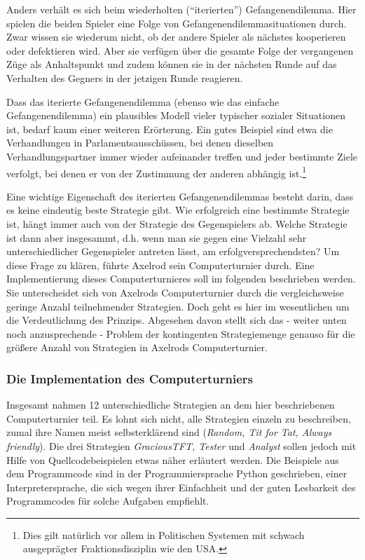 \documentclass[12pt,a4paper,ngerman]{article}
\begin{document}
Anders verhält es sich beim wiederholten ("`iterierten"')
Gefangenendilemma. Hier spielen die beiden Spieler eine Folge von
Gefangenendilemmasituationen durch. Zwar wissen sie wiederum nicht, ob
der andere Spieler als nächstes kooperieren oder defektieren
wird. Aber sie verfügen über die gesamte Folge der vergangenen Züge
als Anhaltspunkt und zudem können sie in der nächsten Runde auf das
Verhalten des Gegners in der jetzigen Runde reagieren.

Dass das iterierte Gefangenendilemma (ebenso wie das einfache
Gefangenendilemma) ein plausibles Modell vieler typischer sozialer
Situationen ist, bedarf kaum einer weiteren Erörterung. Ein gutes
Beispiel sind etwa die Verhandlungen in Parlamentsausschüssen, bei
denen dieselben Verhandlungspartner immer wieder aufeinander treffen
und jeder bestimmte Ziele verfolgt, bei denen er von der Zustimmung
der anderen abhängig ist.\footnote{Dies gilt natürlich vor allem in
Politischen Systemen mit schwach ausgeprägter Fraktionsdisziplin wie
den USA.}

Eine wichtige Eigenschaft des iterierten Gefangenendilemmas besteht
darin, dass es keine eindeutig beste Strategie gibt.  Wie erfolgreich
eine bestimmte Strategie ist, hängt immer auch von der Strategie des
Gegenspielers ab. Welche Strategie ist dann aber insgesammt, d.h. wenn
man sie gegen eine Vielzahl sehr unterschiedlicher Gegenspieler
antreten lässt, am erfolgversprechendsten? Um diese Frage zu klären,
führte Axelrod sein Computerturnier durch. Eine Implementierung dieses
Computerturnieres soll im folgenden beschrieben werden. Sie
unterscheidet sich von Axelrods Computerturnier durch die
vergleichsweise geringe Anzahl teilnehmender Strategien. Doch geht es
hier im wesentlichen um die Verdeutlichung des Prinzips. Abgesehen
davon stellt sich das - weiter unten noch anzusprechende - Problem der
kontingenten Strategiemenge genauso für die größere Anzahl von
Strategien in Axelrods Computerturnier.


\subsubsection{Die Implementation des Computerturniers}

Insgesamt nahmen 12 unterschiedliche Strategien an dem hier
beschriebenen Computerturnier teil. Es lohnt sich nicht, alle
Strategien einzeln zu beschreiben, zumal ihre Namen meist
selbsterklärend sind ({\em Random, Tit for Tat, Always friendly}). Die
drei Strategien {\em GraciousTFT, Tester} und {\em Analyst} sollen
jedoch mit Hilfe von Quellcodebeispielen etwas näher erläutert
werden. Die Beispiele aus dem Programmcode sind in der
Programmiersprache Python geschrieben, einer Interpretersprache, die
sich wegen ihrer Einfachheit und der guten Lesbarkeit des
Programmcodes für solche Aufgaben empfiehlt.
\end{document}
